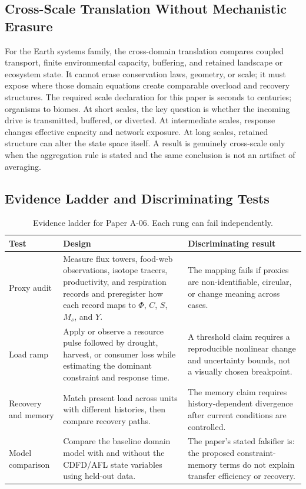 \documentclass[11pt,a4paper]{article}
\begin{document}
\subsection{Cross-Scale Translation Without Mechanistic Erasure}

For the Earth systems family, the cross-domain translation compares coupled transport, finite environmental capacity, buffering, and retained landscape or ecosystem state. It cannot erase conservation laws, geometry, or scale; it must expose where those domain equations create comparable overload and recovery structures. \cite{Holling1973,Turing1952,BakTangWiesenfeld1987}
The required scale declaration for this paper is seconds to centuries; organisms to biomes. At short
scales, the key question is whether the incoming drive is transmitted,
buffered, or diverted. At intermediate scales, response changes effective
capacity and network exposure. At long scales, retained structure can alter the
state space itself. A result is genuinely cross-scale only when the aggregation
rule is stated and the same conclusion is not an artifact of averaging.

\subsection{Evidence Ladder and Discriminating Tests}

\begin{table}[htbp]
\centering
\small
\caption{Evidence ladder for Paper A-06. Each rung can fail independently.}
\begin{tabularx}{\textwidth}{|p{}|X|X|}
\hline
\textbf{Test} & \textbf{Design} & \textbf{Discriminating result} \\
\hline
Proxy audit & Measure flux towers, food-web observations, isotope tracers, productivity, and respiration records and preregister how each record maps to $\Phi$, $C$, $S$, $M_s$, and $Y$. & The mapping fails if proxies are non-identifiable, circular, or change meaning across cases. \\
\hline
Load ramp & Apply or observe a resource pulse followed by drought, harvest, or consumer loss while estimating the dominant constraint and response time. & A threshold claim requires a reproducible nonlinear change and uncertainty bounds, not a visually chosen breakpoint. \\
\hline
Recovery and memory & Match present load across units with different histories, then compare recovery paths. & The memory claim requires history-dependent divergence after current conditions are controlled. \\
\hline
Model comparison & Compare the baseline domain model with and without the CDFD/AFL state variables using held-out data. & The paper's stated falsifier is: the proposed constraint-memory terms do not explain transfer efficiency or recovery. \\
\hline
\end{tabularx}
\end{table}
\end{document}

